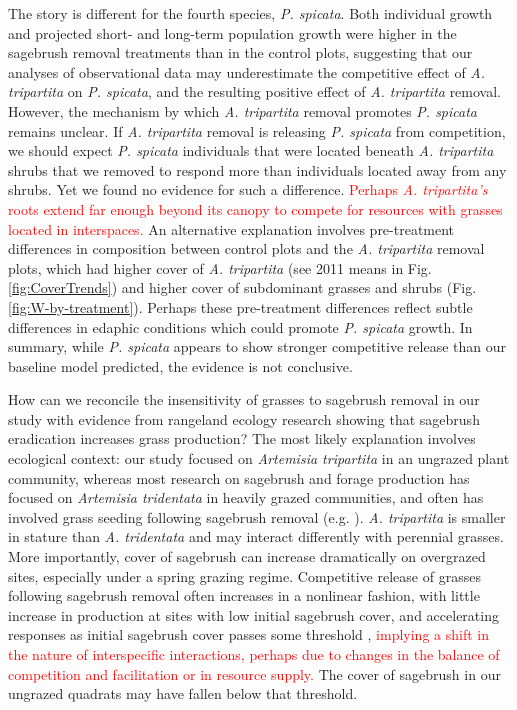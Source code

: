 \documentclass[11pt]{article}
\newcommand{\new}{\textcolor{red}}
\begin{document}
\begin{doublespacing}
The story is different for the fourth species, \textit{P. spicata}. Both individual growth and projected short- and long-term population 
growth were higher in the sagebrush removal treatments than in the control plots, suggesting that our analyses of observational data may 
underestimate the competitive effect of \textit{A. tripartita} on \textit{P. spicata}, and the resulting positive effect of \textit{A. tripartita} 
removal. However, the mechanism by which \textit{A. tripartita} removal promotes \textit{P. spicata} remains unclear. If  \textit{A. tripartita} 
removal is releasing \textit{P. spicata} from competition, we should expect \textit{P. spicata} individuals that were located beneath \textit{A. tripartita} 
shrubs that we removed to respond more than individuals located away from any shrubs. Yet we found no evidence for such a difference. \new{Perhaps 
\textit{A. tripartita's} roots extend far enough beyond its canopy to compete for resources with grasses located in interspaces.}
An alternative explanation involves pre-treatment differences in composition between control plots and  the \textit{A. tripartita} 
removal plots, which had higher cover of \textit{A. tripartita} (see 2011 means in Fig. \ref{fig:CoverTrends}) and higher cover of subdominant 
grasses and shrubs (Fig. \ref{fig:W-by-treatment}). Perhaps these pre-treatment differences reflect subtle differences in 
edaphic conditions which could promote \textit{P. spicata} growth. In summary, while \textit{P. spicata} appears to 
show stronger competitive release than our baseline model predicted, the evidence is not conclusive. 

How can we reconcile the insensitivity of grasses to sagebrush removal in our study with evidence from rangeland ecology 
research showing that sagebrush eradication increases grass production? The most likely explanation involves ecological context: our 
study focused on \textit{Artemisia tripartita} in an ungrazed plant community, whereas most research on sagebrush 
and forage production has focused on \textit{Artemisia tridentata} in heavily grazed communities, and often has involved grass seeding 
following sagebrush removal (e.g. \citealt{Cook1963}). \textit{A. tripartita} is smaller in stature than \textit{A. tridentata} 
and may interact differently with perennial grasses. More importantly, cover of sagebrush can increase dramatically on overgrazed sites, 
especially under a spring grazing regime. Competitive release of grasses following sagebrush removal often increases in 
a nonlinear fashion, with little increase in production at sites with low initial sagebrush cover, 
and accelerating responses as initial sagebrush cover passes some threshold \citep{McDaniel2005}, \new{implying a 
shift in the nature of interspecific interactions, perhaps due to changes in the balance of 
competition and facilitation or in resource supply.} The cover of 
sagebrush in our ungrazed quadrats may have fallen below that threshold. 


\end{doublespacing}
\end{document}
